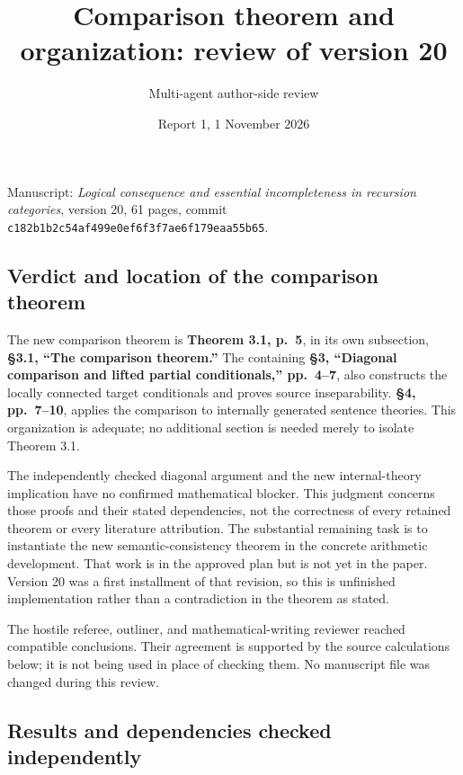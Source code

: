 \documentclass[
  10pt,
  letterpaper,
]{article}
\title{Comparison theorem and organization: review of version 20}
\author{Multi-agent author-side review}
\date{Report 1, 1 November 2026}
\begin{document}
\maketitle

Manuscript: \emph{Logical consequence and essential incompleteness in
recursion categories}, version 20, 61 pages, commit
\texttt{c182b1b2c54af499e0ef6f3f7ae6f179eaa55b65}.

\subsection{Verdict and location of the comparison
theorem}\label{verdict-and-location-of-the-comparison-theorem}

The new comparison theorem is \textbf{Theorem 3.1, p.~5}, in its own
subsection, \textbf{§3.1, ``The comparison theorem.''} The containing
\textbf{§3, ``Diagonal comparison and lifted partial conditionals,''
pp.~4--7}, also constructs the locally connected target conditionals and
proves source inseparability. \textbf{§4, pp.~7--10}, applies the
comparison to internally generated sentence theories. This organization
is adequate; no additional section is needed merely to isolate Theorem
3.1.

The independently checked diagonal argument and the new internal-theory
implication have no confirmed mathematical blocker. This judgment
concerns those proofs and their stated dependencies, not the correctness
of every retained theorem or every literature attribution. The
substantial remaining task is to instantiate the new
semantic-consistency theorem in the concrete arithmetic development.
That work is in the approved plan but is not yet in the paper. Version
20 was a first installment of that revision, so this is unfinished
implementation rather than a contradiction in the theorem as stated.

The hostile referee, outliner, and mathematical-writing reviewer reached
compatible conclusions. Their agreement is supported by the source
calculations below; it is not being used in place of checking them. No
manuscript file was changed during this review.

\subsection{Results and dependencies checked
independently}\label{results-and-dependencies-checked-independently}
\end{document}

